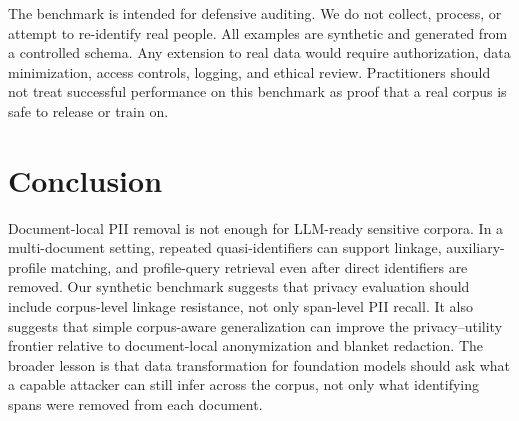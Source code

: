 \documentclass{article}
\begin{document}
The benchmark is intended for defensive auditing.
We do not collect, process, or attempt to re-identify real people.
All examples are synthetic and generated from a controlled schema.
Any extension to real data would require authorization, data minimization, access controls, logging, and ethical review.
Practitioners should not treat successful performance on this benchmark as proof that a real corpus is safe to release or train on.

\section{Conclusion}

Document-local PII removal is not enough for LLM-ready sensitive corpora.
In a multi-document setting, repeated quasi-identifiers can support linkage, auxiliary-profile matching, and profile-query retrieval even after direct identifiers are removed.
Our synthetic benchmark suggests that privacy evaluation should include corpus-level linkage resistance, not only span-level PII recall.
It also suggests that simple corpus-aware generalization can improve the privacy--utility frontier relative to document-local anonymization and blanket redaction.
The broader lesson is that data transformation for foundation models should ask what a capable attacker can still infer across the corpus, not only what identifying spans were removed from each document.
\end{document}
